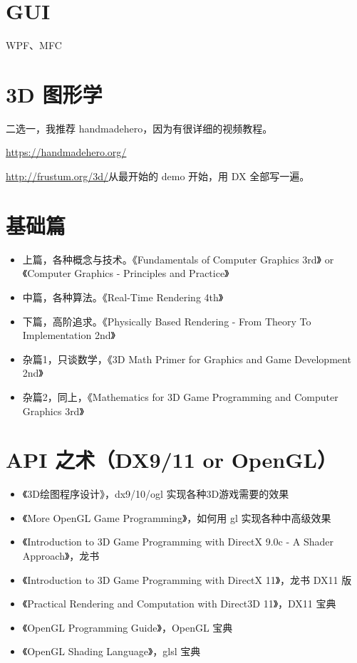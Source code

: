 \documentclass[UTF8,a4paper,12pt]{ctexbook}
\begin{document}
	\section{GUI}
	 	WPF、MFC
	
	\section{3D 图形学}
		二选一，我推荐 handmadehero，因为有很详细的视频教程。
		
		\url{https://handmadehero.org/}
		
		\url{http://frustum.org/3d/}从最开始的 demo 开始，用 DX 全部写一遍。
	
	\section{基础篇}
		\begin{itemize}
			\item 上篇，各种概念与技术。《Fundamentals of Computer Graphics 3rd》 or 《Computer Graphics - Principles and Practice》
			\item 中篇，各种算法。《Real-Time Rendering 4th》
			\item 下篇，高阶追求。《Physically Based Rendering - From Theory To Implementation 2nd》
			\item 杂篇1，只谈数学，《3D Math Primer for Graphics and Game Development 2nd》
			\item 杂篇2，同上，《Mathematics for 3D Game Programming and Computer Graphics 3rd》
		\end{itemize}
		
	\section{API 之术（DX9/11 or OpenGL）}
		\begin{itemize}
			\item 《3D绘图程序设计》，dx9/10/ogl 实现各种3D游戏需要的效果
			\item 《More OpenGL Game Programming》，如何用 gl 实现各种中高级效果
			\item 《Introduction to 3D Game Programming with DirectX 9.0c - A Shader Approach》，龙书
			\item 《Introduction to 3D Game Programming with DirectX 11》，龙书 DX11 版
			\item 《Practical Rendering and Computation with Direct3D 11》，DX11 宝典
			\item 《OpenGL Programming Guide》，OpenGL 宝典		
			\item 《OpenGL Shading Language》，glsl 宝典			
		\end{itemize}
	
\end{document}
